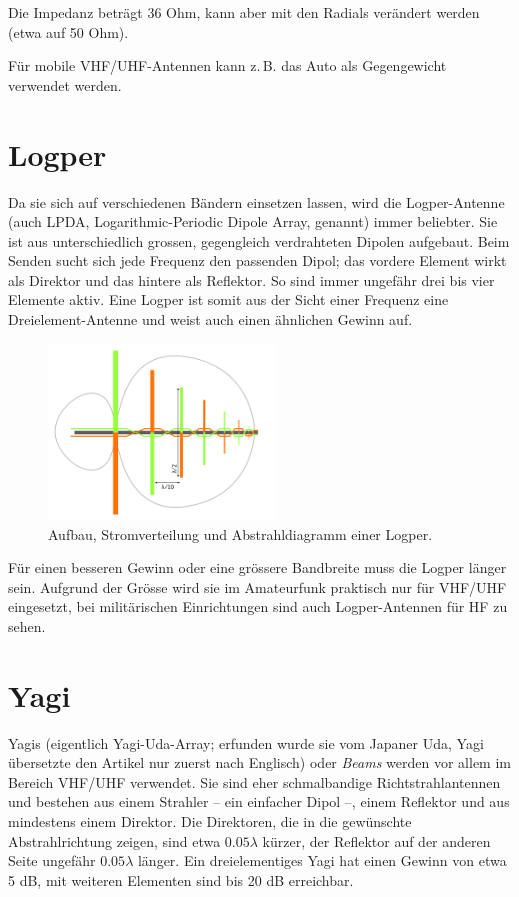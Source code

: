 Die Impedanz beträgt 36 Ohm, kann aber mit den Radials verändert werden (etwa auf 50 Ohm).

Für mobile VHF/UHF-Antennen kann z.\,B. das Auto als Gegengewicht verwendet werden.

\section{Logper}
Da sie sich auf verschiedenen Bändern einsetzen lassen, wird die Logper-Antenne (auch LPDA, Logarithmic-Periodic Dipole Array, genannt) immer beliebter. Sie ist aus unterschiedlich grossen, gegengleich verdrahteten Dipolen aufgebaut. Beim Senden sucht sich jede Frequenz den passenden Dipol; das vordere Element wirkt als Direktor und das hintere als Reflektor. So sind immer ungefähr drei bis vier Elemente aktiv. Eine Logper ist somit aus der Sicht einer Frequenz eine Dreielement-Antenne und weist auch einen ähnlichen Gewinn auf.

\begin{figure}[h!]
 \centering
 \includegraphics[width=6cm]{./png/Amfu-Logper.png}
 \caption{Aufbau, Stromverteilung und Abstrahldiagramm einer Logper.}
 \label{fig:logper}
\end{figure}

Für einen besseren Gewinn oder eine grössere Bandbreite muss die Logper länger sein. Aufgrund der Grösse wird sie im Amateurfunk praktisch nur für VHF/UHF eingesetzt, bei militärischen Einrichtungen sind auch Logper-Antennen für HF zu sehen.

\section{Yagi} \label{sec:yagi}
Yagis (eigentlich Yagi-Uda-Array; erfunden wurde sie vom Japaner Uda, Yagi übersetzte den Artikel nur zuerst nach Englisch) oder \textit{Beams} werden vor allem im Bereich VHF/UHF verwendet. Sie sind eher schmalbandige Richtstrahlantennen und bestehen aus einem Strahler – ein einfacher Dipol –, einem Reflektor und aus mindestens einem Direktor. Die Direktoren, die in die gewünschte Abstrahlrichtung zeigen, sind etwa $0.05 \lambda$ kürzer, der Reflektor auf der anderen Seite ungefähr $0.05 \lambda$ länger. Ein dreielementiges Yagi hat einen Gewinn von etwa 5 dB, mit weiteren Elementen sind bis 20 dB erreichbar.

